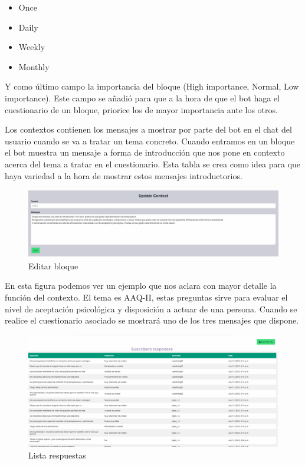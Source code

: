 \begin{itemize}
    \item Once
    \item Daily
    \item Weekly
    \item Monthly
\end{itemize}

Y como último campo la importancia del bloque (High importance, Normal, Low importance). Este campo  se añadió para que a la hora de que el bot haga el cuestionario de un bloque, priorice los de mayor importancia ante los otros.

Los contextos contienen los mensajes a mostrar por parte del bot en el chat del usuario cuando se va a tratar un tema concreto. Cuando entramos en un bloque el bot muestra un mensaje a forma de introducción que nos pone en contexto acerca del tema a tratar en el cuestionario. Esta tabla se crea como idea para que haya variedad a la hora de mostrar estos mensajes introductorios. \vspace{2cm}


\begin{figure}[!ht]
    \centering
    \includegraphics[width=1\textwidth]{imagenes/update_context.png}
    \caption{Editar bloque}
    \label{fig:update-bloque}
\end{figure}

En esta figura podemos ver un ejemplo que nos aclara con mayor detalle la función del contexto. El tema es AAQ-II, estas preguntas sirve para evaluar el nivel de aceptación psicológica y disposición a actuar de una persona. Cuando se realice el cuestionario asociado se mostrará uno de los tres mensajes que dispone.

\begin{figure}[!ht]
    \centering
    \includegraphics[width=1\textwidth]{imagenes/list_answers.png}
    \caption{Lista respuestas}
    \label{fig:list-answers}
\end{figure}

